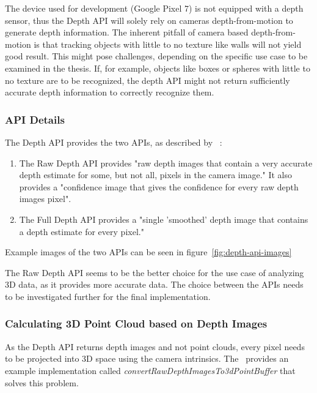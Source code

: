 The device used for development (Google Pixel 7) is not equipped with a depth sensor, thus the Depth API will solely rely on cameras depth-from-motion to generate depth information.
The inherent pitfall of camera based depth-from-motion is that tracking objects with little to no texture like walls will not yield good result.
This might pose challenges, depending on the specific use case to be examined in the thesis.
If, for example, objects like boxes or spheres with little to no texture are to be recognized,
the depth API might not return sufficiently accurate depth information to correctly recognize them.

\subsubsection{API Details}
The Depth API provides the two APIs, as described by ~\parencite{arcore-doc-raw-depth}:
\begin{enumerate}
    \item The Raw Depth API provides "raw depth images that contain a very accurate depth estimate for some, but not all, pixels in the camera image."
    It also provides a "confidence image that gives the confidence for every raw depth images pixel".
    \item The Full Depth API provides a "single 'smoothed' depth image that contains a depth estimate for every pixel."
\end{enumerate}

Example images of the two APIs can be seen in figure~\ref{fig:depth-api-images}

The Raw Depth API seems to be the better choice for the use case of analyzing 3D data, as it provides more accurate data.
The choice between the APIs needs to be investigated further for the final implementation.

\subsubsection{Calculating 3D Point Cloud based on Depth Images}
As the Depth API returns depth images and not point clouds, every pixel needs to be projected into 3D space using the camera intrinsics.
The~ provides an example implementation called \textit{convertRawDepthImagesTo3dPointBuffer} that solves this problem.



